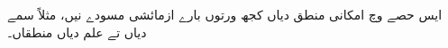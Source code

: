 \documentclass[../../include/open-logic-part]{subfiles}
\begin{document}

\begin{editorial}
ایس حصے وچ امکانی منطق دیاں کجھ ورتوں بارے ازمائشی مسودے نیں، مثلاً
سمے دیاں تے علم دیاں منطقاں۔
\end{editorial}



\OLEndPartHook
\end{document}
